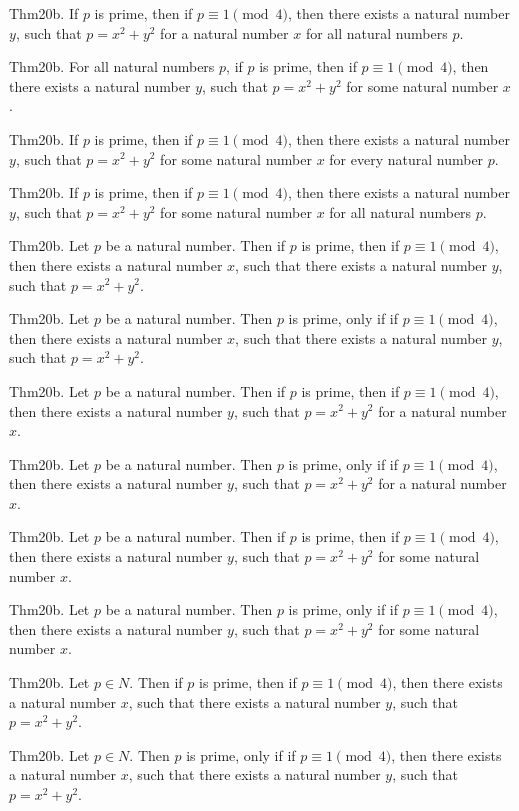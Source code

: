 \documentclass{article}
\begin{document}
Thm20b. If $p$ is prime, then if $p \equiv 1 \pmod{ 4}$, then there exists a natural number $y$, such that $p = x ^{ 2}+ y ^{ 2}$ for a natural number $x$ for all natural numbers $p$.

Thm20b. For all natural numbers $p$, if $p$ is prime, then if $p \equiv 1 \pmod{ 4}$, then there exists a natural number $y$, such that $p = x ^{ 2}+ y ^{ 2}$ for some natural number $x$.

Thm20b. If $p$ is prime, then if $p \equiv 1 \pmod{ 4}$, then there exists a natural number $y$, such that $p = x ^{ 2}+ y ^{ 2}$ for some natural number $x$ for every natural number $p$.

Thm20b. If $p$ is prime, then if $p \equiv 1 \pmod{ 4}$, then there exists a natural number $y$, such that $p = x ^{ 2}+ y ^{ 2}$ for some natural number $x$ for all natural numbers $p$.

Thm20b. Let $p$ be a natural number. Then if $p$ is prime, then if $p \equiv 1 \pmod{ 4}$, then there exists a natural number $x$, such that there exists a natural number $y$, such that $p = x ^{ 2}+ y ^{ 2}$.

Thm20b. Let $p$ be a natural number. Then $p$ is prime, only if if $p \equiv 1 \pmod{ 4}$, then there exists a natural number $x$, such that there exists a natural number $y$, such that $p = x ^{ 2}+ y ^{ 2}$.

Thm20b. Let $p$ be a natural number. Then if $p$ is prime, then if $p \equiv 1 \pmod{ 4}$, then there exists a natural number $y$, such that $p = x ^{ 2}+ y ^{ 2}$ for a natural number $x$.

Thm20b. Let $p$ be a natural number. Then $p$ is prime, only if if $p \equiv 1 \pmod{ 4}$, then there exists a natural number $y$, such that $p = x ^{ 2}+ y ^{ 2}$ for a natural number $x$.

Thm20b. Let $p$ be a natural number. Then if $p$ is prime, then if $p \equiv 1 \pmod{ 4}$, then there exists a natural number $y$, such that $p = x ^{ 2}+ y ^{ 2}$ for some natural number $x$.

Thm20b. Let $p$ be a natural number. Then $p$ is prime, only if if $p \equiv 1 \pmod{ 4}$, then there exists a natural number $y$, such that $p = x ^{ 2}+ y ^{ 2}$ for some natural number $x$.

Thm20b. Let $p \in N$. Then if $p$ is prime, then if $p \equiv 1 \pmod{ 4}$, then there exists a natural number $x$, such that there exists a natural number $y$, such that $p = x ^{ 2}+ y ^{ 2}$.

Thm20b. Let $p \in N$. Then $p$ is prime, only if if $p \equiv 1 \pmod{ 4}$, then there exists a natural number $x$, such that there exists a natural number $y$, such that $p = x ^{ 2}+ y ^{ 2}$.
\end{document}
